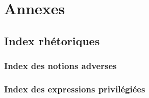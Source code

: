 \documentclass[12pt, a4paper]{article}
\begin{document}
\newpage

\section{Annexes}

\subsection{Index rhétoriques}
\label{gloss}
\subsubsection{Index des notions adverses}
\subsubsection{Index des expressions privilégiées}

\newpage
\tableofcontents
\end{document}
